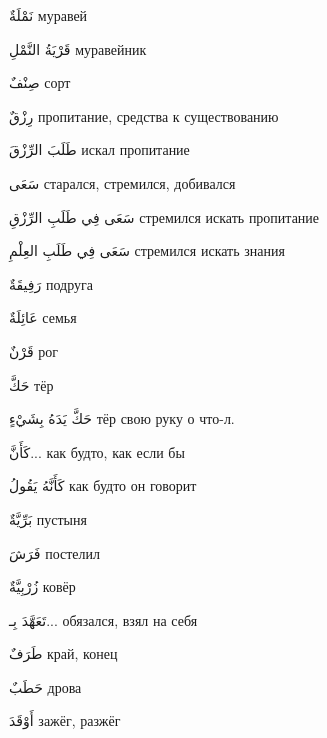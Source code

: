 \documentclass[a5paper]{article}
\newcommand\textstyleDropCaps[1]{#1}
\newcommand\textstyleCaptioncharacters[1]{#1}
\begin{document}
\textstyleCaptioncharacters{نَمْلَةٌ }\textstyleDropCaps{муравей‎}

\textstyleCaptioncharacters{قَرْيَةُ النَّمْلِ }\textstyleDropCaps{муравейник‎}

\textstyleCaptioncharacters{صِنْفٌ }\textstyleDropCaps{сорт‎}

\textstyleCaptioncharacters{رِزْقٌ }\textstyleDropCaps{пропитание, средства к существованию‎}

\textstyleCaptioncharacters{طَلَبَ الرِّزْقَ }\textstyleDropCaps{искал про­питание‎}

\textstyleCaptioncharacters{سَعَى }\textstyleDropCaps{старался, стремил­ся, добивался‎}

\textstyleCaptioncharacters{سَعَى فِي طَلَبِ الرِّزْقِ }\textstyleDropCaps{стремился искать пропитание ‎}

\textstyleCaptioncharacters{سَعَى فِي طَلَبِ العِلْمِ }\textstyleDropCaps{стремился искать знания ‎}

\textstyleCaptioncharacters{رَفِيقَةٌ }\textstyleDropCaps{подруга‎}

\textstyleCaptioncharacters{عَائِلَةٌ }\textstyleDropCaps{семья‎}

\textstyleCaptioncharacters{قَرْنٌ }\textstyleDropCaps{рог‎}

\textstyleCaptioncharacters{حَكَّ }\textstyleDropCaps{тёр‎}

\textstyleCaptioncharacters{حَكَّ يَدَهُ بِشَيْءٍ }\textstyleDropCaps{тёр свою руку о что-л. ‎}

\textstyleCaptioncharacters{كَأَنَّ... }\textstyleDropCaps{как будто, как если бы‎}

\textstyleCaptioncharacters{كَأَنَّهُ يَقُولُ }\textstyleDropCaps{как будто он говорит‎}

\textstyleCaptioncharacters{بَرِّيَّةٌ }\textstyleDropCaps{пустыня‎}

\textstyleCaptioncharacters{فَرَشَ }\textstyleDropCaps{постелил‎}

\textstyleCaptioncharacters{زُرْبِيَّةٌ }\textstyleDropCaps{ковёр‎}

\textstyleCaptioncharacters{تَعَهَّدَ بِـ... }\textstyleDropCaps{обязался, взял на себя‎}

\textstyleCaptioncharacters{طَرَفٌ }\textstyleDropCaps{край, конец‎}

\textstyleCaptioncharacters{حَطَبٌ }\textstyleDropCaps{дрова‎}

\textstyleCaptioncharacters{أَوْقَدَ }\textstyleDropCaps{зажёг, разжёг‎}
\end{document}

